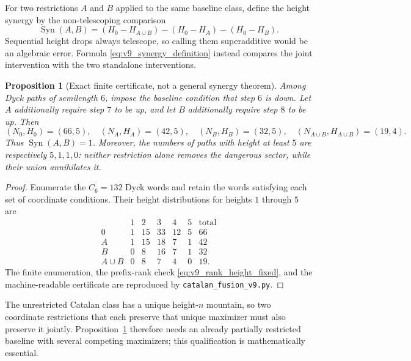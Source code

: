 \documentclass[11pt]{amsart}
\numberwithin{equation}{section}
\theoremstyle{plain}
\newtheorem{proposition}[theorem]{Proposition}
\theoremstyle{definition}
\theoremstyle{remark}
\begin{document}
For two restrictions $A$ and $B$ applied to the same baseline class, define
the height synergy by the non-telescoping comparison
\begin{equation}
\boxed{
\operatorname{Syn}(A,B)
=(H_0-H_{A\cup B})-(H_0-H_A)-(H_0-H_B).}
\label{eq:v9_synergy_definition}
\end{equation}
Sequential height drops always telescope, so calling them superadditive would
be an algebraic error.  Formula \eqref{eq:v9_synergy_definition} instead
compares the joint intervention with the two standalone interventions.

\begin{proposition}[Exact finite certificate, not a general synergy theorem]
\label{prop:v9_exact_synergy}
Among Dyck paths of semilength $6$, impose the baseline condition that step
$6$ is down.  Let $A$ additionally require step $7$ to be up, and let $B$
additionally require step $8$ to be up.  Then
\begin{equation}
(N_0,H_0)=(66,5),\quad
(N_A,H_A)=(42,5),\quad
(N_B,H_B)=(32,5),\quad
(N_{A\cup B},H_{A\cup B})=(19,4).
\label{eq:v9_synergy_counts}
\end{equation}
Thus $\operatorname{Syn}(A,B)=1$.  Moreover, the numbers of paths with height
at least $5$ are respectively $5,1,1,0$: neither restriction alone removes
the dangerous sector, while their union annihilates it.
\end{proposition}

\begin{proof}
Enumerate the $C_6=132$ Dyck words and retain the words satisfying each set of
coordinate conditions.  Their height distributions for heights $1$ through
$5$ are
\begin{equation}
\begin{array}{c|rrrrr|r}
&1&2&3&4&5&\text{total}\\ \hline
0&1&15&33&12&5&66\\
A&1&15&18&7&1&42\\
B&0&8&16&7&1&32\\
A\cup B&0&8&7&4&0&19.
\end{array}
\label{eq:v9_synergy_distribution}
\end{equation}
The finite enumeration, the prefix-rank check
\eqref{eq:v9_rank_height_fixed}, and the machine-readable certificate are
reproduced by \texttt{catalan\_fusion\_v9.py}.
\end{proof}

The unrestricted Catalan class has a unique height-$n$ mountain, so two
coordinate restrictions that each preserve that unique maximizer must also
preserve it jointly.  Proposition~\ref{prop:v9_exact_synergy} therefore needs
an already partially restricted baseline with several competing maximizers;
this qualification is mathematically essential.
\end{document}
